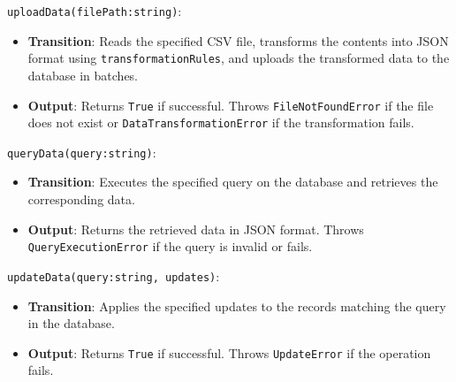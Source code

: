 \documentclass[12pt, titlepage]{article}
\begin{document}
\begin{description}
  \texttt{uploadData(filePath:string)}:
  \item
  \begin{itemize}
    \item \textbf{Transition}: Reads the specified CSV file, transforms the contents into
    JSON format using \texttt{transformationRules}, and uploads the transformed data to
    the database in batches.
  \end{itemize}
  \item
  \begin{itemize}
    \item \textbf{Output}: Returns \texttt{True} if successful. Throws \texttt{FileNotFoundError}
    if the file does not exist or \texttt{DataTransformationError} if the transformation fails.
  \end{itemize}
  \item


\texttt{queryData(query:string)}:
  \item
  \begin{itemize}
    \item \textbf{Transition}: Executes the specified query on the database and retrieves the
    corresponding data.
  \end{itemize}
  \item 
  \begin{itemize}
    \item \textbf{Output}: Returns the retrieved data in JSON format. Throws \texttt{QueryExecutionError}
    if the query is invalid or fails.
  \end{itemize}
  \item

\texttt{updateData(query:string, updates)}:
  \item
  \begin{itemize}
    \item \textbf{Transition}: Applies the specified updates to the records matching the query
    in the database.
  \end{itemize}
  \item
  \begin{itemize}
    \item \textbf{Output}: Returns \texttt{True} if successful. Throws \texttt{UpdateError}
    if the operation fails.
  \end{itemize}
  \item


\end{description}
\end{document}

